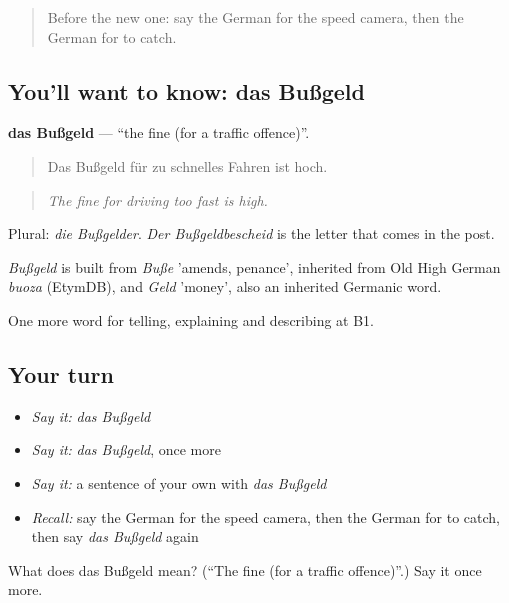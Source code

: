 \begin{quote}
Before the new one: say the German for the speed camera, then the German for to catch.
\end{quote}

\subsection*{You'll want to know: das Bußgeld}
\textbf{das Bußgeld} — \textquotedblleft{}the fine (for a traffic offence)\textquotedblright{}.

\begin{quote}
Das Bußgeld für zu schnelles Fahren ist hoch.
\end{quote}

\begin{quote}
\emph{The fine for driving too fast is high.}
\end{quote}

Plural: \emph{die Bußgelder}. \emph{Der Bußgeldbescheid} is the letter that comes in the post.

\begin{cousinweb}
\emph{Bußgeld} is built from \emph{Buße} 'amends, penance', inherited from Old High German \emph{buoza} (EtymDB), and \emph{Geld} 'money', also an inherited Germanic word.
\end{cousinweb}

\begin{grammarlens}[title={What you've built}]
One more word for telling, explaining and describing at B1.
\end{grammarlens}

\subsection*{Your turn}
\begin{itemize}
\raggedright
  \item \emph{Say it:} \emph{das Bußgeld}
  \item \emph{Say it:} \emph{das Bußgeld}, once more
  \item \emph{Say it:} a sentence of your own with \emph{das Bußgeld}
  \item \emph{Recall:} say the German for the speed camera, then the German for to catch, then say \emph{das Bußgeld} again
\end{itemize}

\begin{tcolorbox}[breakable,colback=teal!4,colframe=teal!35!black,title={Before you move on}]
What does das Bußgeld mean? (\textquotedblleft{}The fine (for a traffic offence)\textquotedblright{}.) Say it once more.
\end{tcolorbox}
